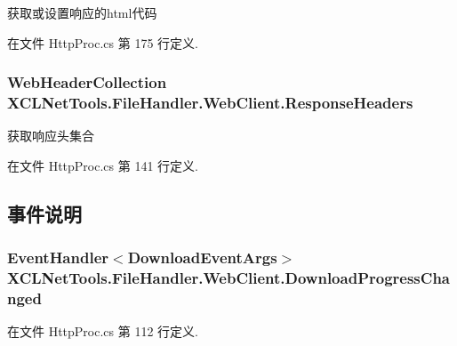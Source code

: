 获取或设置响应的html代码 



在文件 Http\-Proc.\-cs 第 175 行定义.

\hypertarget{class_x_c_l_net_tools_1_1_file_handler_1_1_web_client_a3d00d3457c23ce30274af963f4cab6bb}{
\subsubsection[{Response\-Headers}]{\setlength{\rightskip}{0pt plus 5cm}Web\-Header\-Collection X\-C\-L\-Net\-Tools.\-File\-Handler.\-Web\-Client.\-Response\-Headers\hspace{0.3cm}{\ttfamily [get]}}}\label{class_x_c_l_net_tools_1_1_file_handler_1_1_web_client_a3d00d3457c23ce30274af963f4cab6bb}


获取响应头集合 



在文件 Http\-Proc.\-cs 第 141 行定义.



\subsection{事件说明}
\hypertarget{class_x_c_l_net_tools_1_1_file_handler_1_1_web_client_aa1e50d608381b728356547eff9f80213}{
\subsubsection[{Download\-Progress\-Changed}]{\setlength{\rightskip}{0pt plus 5cm}Event\-Handler$<${\bf Download\-Event\-Args}$>$ X\-C\-L\-Net\-Tools.\-File\-Handler.\-Web\-Client.\-Download\-Progress\-Changed}}\label{class_x_c_l_net_tools_1_1_file_handler_1_1_web_client_aa1e50d608381b728356547eff9f80213}


在文件 Http\-Proc.\-cs 第 112 行定义.

